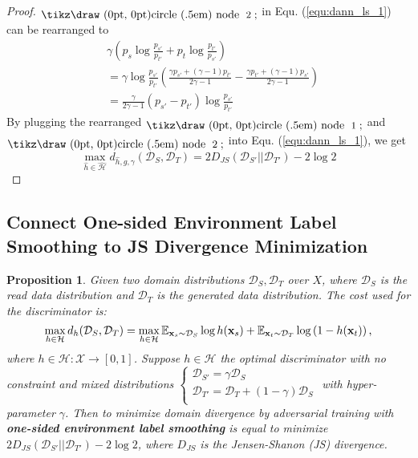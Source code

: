 \documentclass{article} \usepackage{iclr2023_conference,times}
\newcommand{\E}{\mathbb{E}}
\newtheorem{prop}{Proposition}
\newcommand{\myref}[1]{Equ. (\ref{#1})}
\newcommand{\D}{\mathcal{D}}
\newcommand*{\circled}[1]{\lower.7ex\hbox{\tikz\draw (0pt, 0pt)circle (.5em) node {\makebox[1em][c]{\small #1}};}}
\begin{document}
\begin{proof}
$\rm \circled{\rm 2}$ in \myref{equ:dann_ls_1} can be rearranged to
\begin{equation}
\begin{aligned}
&\gamma\left(p_s\log\frac{p_{s'}}{p_{t'}}+p_t\log\frac{p_{t'}}{p_{s'}}\right)\\
&=\gamma\log\frac{p_{s'}}{p_{t'}}\left(\frac{\gamma p_{s'}+(\gamma-1)p_{t'}}{2\gamma-1}-\frac{\gamma p_{t'}+(\gamma-1)p_{s'}}{2\gamma-1}\right)\\
&=\frac{\gamma}{2\gamma-1}(p_{s'}-p_{t'})\log\frac{p_{s'}}{p_{t'}}
\end{aligned}\end{equation}
By plugging the rearranged $\rm \circled{\rm 1}$ and $\rm \circled{\rm 2}$ into \myref{equ:dann_ls_1}, we get
\begin{equation}
\max_{\hat{h}\in\hat{\mathcal{H}}} d_{\hat{h},g,\gamma}(\D_S,\D_T)=2D_{JS}(\D_{S'}||\D_{T'})-2\log2\end{equation}
\end{proof}

\subsection{Connect One-sided Environment Label Smoothing to JS Divergence Minimization}\label{sec:theo_gan_js}
\begin{prop}
Given two domain distributions $\mathcal{D}_S,\mathcal{D}_T$ over $X$, where $\mathcal{D}_S$ is the read data distribution and $\mathcal{D}_T$ is the generated data distribution. The cost used for the discriminator is:
\begin{equation}
    \max_{h\in\mathcal{H}} d_{h}(\D_S,\D_T)=\max_{h\in{\mathcal{H}}} \E_{\x_s\sim \D_S}\log h(\x_s)+\E_{\x_t\sim\D_T} \log\left(1-h(\x_t)\right),\end{equation}
where $h\in\mathcal{H}:\mathcal{X}\rightarrow[0,1]$. Suppose ${h}\in{\mathcal{H}}$ the optimal discriminator with no constraint and mixed distributions $\left\{         \begin{array}{l} 
    \D_{S'}=\gamma\D_S\\ 
    \D_{T'}=\D_T+(1-\gamma)\D_S\\ 
  \end{array}\right.$ with hyper-parameter $\gamma$. Then to minimize domain divergence by adversarial training with \textbf{one-sided environment label smoothing} is equal to minimize $2D_{JS}(\D_{S'}||\D_{T'})-2\log2$, where $D_{JS}$ is the Jensen-Shanon (JS) divergence.
  \label{prop2}
\end{prop}
\end{document}
